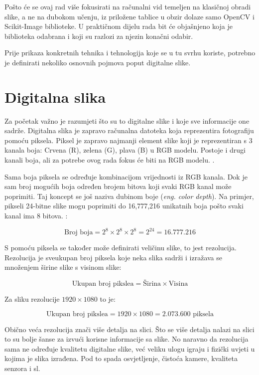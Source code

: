 \documentclass{foi}
\begin{document}
Pošto će se ovaj rad više fokusirati na računalni vid temeljen na klasičnoj obradi slike, a ne na dubokom učenju, iz priložene tablice u obzir dolaze samo OpenCV i Scikit-Image biblioteke. U praktičnom dijelu rada bit će objašnjeno koja je biblioteka odabrana i koji su razlozi za njezin konačni odabir.

Prije prikaza konkretnih tehnika i tehnologija koje se u tu svrhu koriste, potrebno je definirati nekoliko osnovnih pojmova poput digitalne slike.

\section{Digitalna slika}

Za početak važno je razumjeti što su to digitalne slike i koje sve informacije one sadrže. Digitalna slika je zapravo računalna datoteka koja reprezentira fotografiju pomoću piksela. Piksel je zapravo najmanji element slike koji je reprezentiran s 3 kanala boja: Crvena (R), zelena (G), plava (B) u RGB modelu. Postoje i drugi kanali boja, ali za potrebe ovog rada fokus će biti na RGB modelu. \cite{DigitalnaSlika}.

Sama boja piksela se određuje kombinacijom vrijednosti iz RGB kanala. Dok je sam broj mogućih boja određen brojem bitova koji svaki RGB kanal može poprimiti. Taj koncept se još naziva dubinom boje (\textit{eng. color depth}). Na primjer, pikseli 24-bitne slike mogu poprimiti do 16,777,216 unikatnih boja pošto svaki kanal ima 8 bitova. \cite{DigitalnaSlika}:

\[
\text{Broj boja} = 2^{8} \times 2^{8} \times 2^{8} = 2^{24} = 16.777.216
\]

S pomoću piksela se također može definirati veličinu slike, to jest rezolucija. Rezolucija je sveukupan broj piksela koje neka slika sadrži i izražava se množenjem širine slike s visinom slike:

\[
\text{Ukupan broj pikslea} = \text{Širina} \times \text{Visina}
\]

Za sliku rezolucije $1920 \times 1080$ to je:

\[
\text{Ukupan broj pikslea} = 1920 \times 1080 = 2.073.600 \text{ piksela}
\]

Obično veća rezolucija znači više detalja na slici. Što se više detalja nalazi na slici to su bolje šanse za izvući korisne informacije sa slike. No naravno da rezolucija sama ne određuje kvalitetu digitalne slike, već veliku ulogu igraju i fizički uvjeti u kojima je slika izrađena. Pod to spada osvjetljenje, čistoća kamere, kvaliteta senzora i sl.
\end{document}
